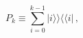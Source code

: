 \begin{equation}
P_k \equiv \sum_{i=0}^{k-1}|i\rangle\!\rangle \langle\!\langle i| \,,
\label{eq:5.13}
\end{equation}

